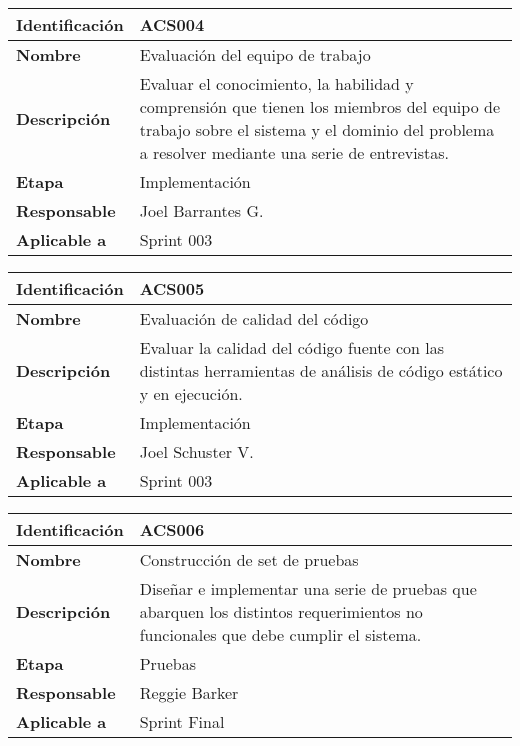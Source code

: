 \documentclass{scrreprt}
\begin{document}
\vspace{0.8cm}

\begin{tabular}{ |p{3cm}|p{10cm}|  }
  \hline
  \textbf{Identificación} & ACS004 \\
  \hline
  \textbf{Nombre} & Evaluación del equipo de trabajo \\
  \hline
  \textbf{Descripción} & Evaluar el conocimiento, la habilidad y comprensión que tienen los miembros del equipo de trabajo sobre el sistema y el dominio del problema a resolver mediante una serie de entrevistas. \\
  \hline
  \textbf{Etapa} & Implementación \\
  \hline
  \textbf{Responsable} & Joel Barrantes G. \\
  \hline
  \textbf{Aplicable a} & Sprint 003 \\
  \hline  
\end{tabular}

\vspace{0.8cm}

\begin{tabular}{ |p{3cm}|p{10cm}|  }
  \hline
  \textbf{Identificación} & ACS005 \\
  \hline
  \textbf{Nombre} & Evaluación de calidad del código \\
  \hline
  \textbf{Descripción} & Evaluar la calidad del código fuente con las distintas herramientas de análisis de código estático y en ejecución. \\
  \hline
  \textbf{Etapa} & Implementación \\
  \hline
  \textbf{Responsable} & Joel Schuster V. \\
  \hline
  \textbf{Aplicable a} & Sprint 003 \\
  \hline
\end{tabular}

\vspace{0.8cm}

\begin{tabular}{ |p{3cm}|p{10cm}|  }
  \hline
  \textbf{Identificación} & ACS006 \\
  \hline
  \textbf{Nombre} & Construcción de set de pruebas \\
  \hline
  \textbf{Descripción} & Diseñar e implementar una serie de pruebas que abarquen los distintos requerimientos no funcionales que debe cumplir el sistema. \\
  \hline
  \textbf{Etapa} & Pruebas \\
  \hline
  \textbf{Responsable} & Reggie Barker \\
  \hline
  \textbf{Aplicable a} & Sprint Final \\
  \hline  
\end{tabular}
\end{document}
